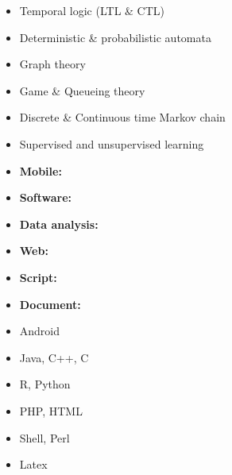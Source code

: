 
\begin{itemize}

\item Temporal logic (LTL \& CTL)
\item Deterministic \& probabilistic automata
\item Graph theory
\item Game \& Queueing theory
\item Discrete \& Continuous time Markov chain
\item Supervised and unsupervised learning

\end{itemize}



\begin{minipage}{0.29\columnwidth}{}
\begin{itemize}
\item \textbf{Mobile:}
\item \textbf{Software:}
\item \textbf{Data analysis:}
\item \textbf{Web:}
\item \textbf{Script:}
\item \textbf{Document:}
\end{itemize}
\end{minipage}
\begin{minipage}{0.32\columnwidth}{}
\begin{itemize}
  \item[] Android
  \item[] Java, C++, C
  \item[] R, Python
  \item[] PHP, HTML
  \item[] Shell, Perl
  \item[] Latex
\end{itemize}
\end{minipage}


